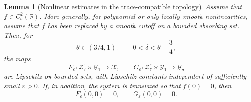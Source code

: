 \documentclass[11pt]{article}
\newtheorem{lemma}[theorem]{Lemma}
\theoremstyle{definition}
\theoremstyle{remark}
\numberwithin{equation}{section}
\newcommand{\mc}[1]{\mathcal{#1}}
\begin{document}
\begin{lemma}[Nonlinear estimates in the trace-compatible topology]
\label{lem:thin-domain-nonlinear-estimates}
Assume that \(f\in C_b^2(\mathbb R)\). More generally, for polynomial or only
locally smooth nonlinearities, assume that \(f\) has been replaced by a smooth
cutoff on a bounded absorbing set. Then, for
\[
\theta\in(3/4,1),
\qquad
0<\delta<\theta-\frac34,
\]
the maps
\[
F_\varepsilon:\mc Z_\theta^\varepsilon\times\mathcal Y_1\to\mathcal X,
\qquad
G_\varepsilon:\mc Z_\theta^\varepsilon\times\mathcal Y_1\to\mathcal Y_\delta
\]
are Lipschitz on bounded sets, with Lipschitz constants independent of
sufficiently small \(\varepsilon>0\). If, in addition, the system is translated
so that \(f(0)=0\), then
\[
F_\varepsilon(0,0)=0,
\qquad
G_\varepsilon(0,0)=0.
\]
\end{lemma}
\end{document}
